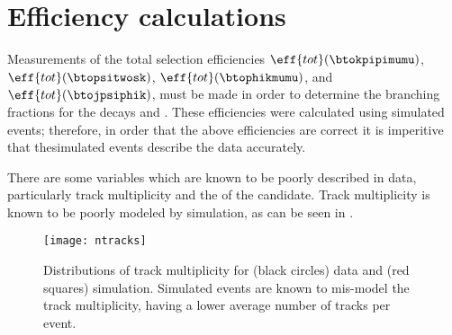 \section{Efficiency calculations}
Measurements of the total selection efficiencies
$\eff{tot}(\btokpipimumu)$,
$\eff{tot}(\btopsitwosk)$,
$\eff{tot}(\btophikmumu)$, and
$\eff{tot}(\btojpsiphik)$,
must be made in order to determine the branching fractions for the decays \btokpipimumu and
\btophikmumu.
These efficiencies were calculated using simulated events; therefore, in order that the above
efficiencies are correct it is imperitive that thesimulated events describe the data accurately.

There are some variables which are known to be poorly described in data, particularly track
multiplicity and the \chisqvtx of the \Bp candidate.
Track multiplicity is known to be poorly modeled by simulation, as can be seen in
.


\begin{figure}
  \begin{center}
    \texttt{[image: ntracks]}
    \caption{\small
      Distributions of track multiplicity for (black circles) data and (red squares) simulation.
      Simulated events are known to mis-model the track multiplicity, having a lower average number
      of tracks per event.
    }
    \label{fig:hhh:ntracks}
  \end{center}
\end{figure}






